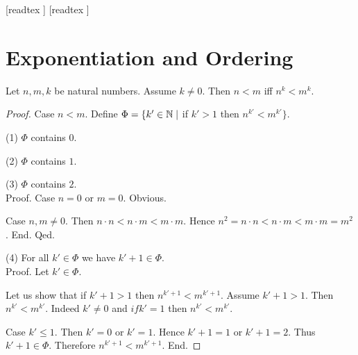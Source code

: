 \documentclass[10pt]{article}
\begin{document}
  \begin{imports}
    \begin{forthel}
      [readtex ]
      [readtex ]
    \end{forthel}
  \end{imports}


  \section*{Exponentiation and Ordering}

  \begin{forthel}
    \begin{proposition}
      Let $n, m, k$ be natural numbers.
      Assume $k \neq 0$.
      Then $n < m$ iff $n^{k} < m^{k}$.
    \end{proposition}
    \begin{proof}
      Case $n < m$.
        Define $\Phi = \{ k' \in \mathbb{N} \mid$ if $k' > 1$ then $n^{k'} < m^{k'} \}$.

        (1) $\Phi$ contains $0$.

        (2) $\Phi$ contains $1$.

        (3) $\Phi$ contains $2$. \\
        Proof.
          Case $n = 0$ or $m = 0$. Obvious.

          Case $n, m \neq 0$.
            Then $n \cdot n
              < n \cdot m
              < m \cdot m$.
            Hence $n^{2}
              = n \cdot n
              < n \cdot m
              < m \cdot m
              = m^{2}$.
          End.
        Qed.

        (4) For all $k' \in \Phi$ we have $k' + 1 \in \Phi$. \\
        Proof.
          Let $k' \in \Phi$.

          Let us show that if $k' + 1 > 1$ then $n^{k' + 1} < m^{k' + 1}$.
            Assume $k' + 1 > 1$.
            Then $n^{k'} < m^{k'}$.
            Indeed $k' \neq 0$ and $if k' = 1$ then $n^{k'} < m^{k'}$.

            Case $k' \leq 1$.
              Then $k' = 0$ or $k' = 1$.
              Hence $k' + 1 = 1$ or $k' + 1 = 2$.
              Thus $k' + 1 \in \Phi$.
              Therefore $n^{k' + 1} < m^{k' + 1}$.
            End.


\end{proof}
\end{forthel}
\end{document}
